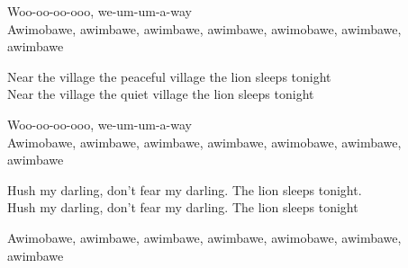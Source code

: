 \documentclass{novel}
\begin{document}
Woo-oo-oo-ooo, we-um-um-a-way\\
Awimobawe, awimbawe, awimbawe, awimbawe, awimobawe, awimbawe, awimbawe

Near the village the peaceful village the lion sleeps tonight\\
Near the village the quiet village the lion sleeps tonight

Woo-oo-oo-ooo, we-um-um-a-way\\
Awimobawe, awimbawe, awimbawe, awimbawe, awimobawe, awimbawe, awimbawe

Hush my darling, don't fear my darling. The lion sleeps tonight.\\
Hush my darling, don't fear my darling. The lion sleeps tonight

Awimobawe, awimbawe, awimbawe, awimbawe, awimobawe, awimbawe, awimbawe
\end{document}
